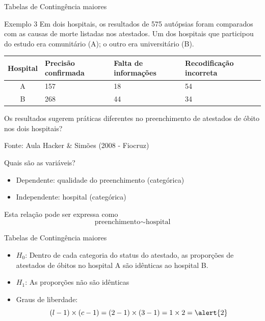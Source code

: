 \documentclass{beamer}
\begin{document}
\begin{frame}{Tabelas de Contingência maiores}
  \begin{exampleblock}{Exemplo 3}
    \footnotesize
    Em dois hospitais, os resultados de 575 autópsias
    foram comparados com as causas de morte listadas nos
    atestados. Um dos hospitais que participou do estudo era
    comunitário (A); o outro era universitário (B).

    \bigskip
    \scriptsize
    \begin{tabular}{c|p{2cm}|p{2cm}|p{2cm}}
      Hospital & Precisão confirmada & Falta de informações &
      Recodificação incorreta \\
      \hline
      A & 157 & 18 & 54 \\
      \hline
      B & 268 & 44 & 34 \\
    \end{tabular}
    \small
    \bigskip
    \bigskip
    Os resultados sugerem práticas diferentes no preenchimento de
    atestados de óbito nos dois hospitais?
  \end{exampleblock}
  \vfill
  {\hfill \footnotesize Fonte: Aula Hacker \& Simões (2008 - Fiocruz)}
\end{frame}

\begin{frame}{Quais são as variáveis?}
  \begin{itemize}
    \small
  \item Dependente: qualidade do preenchimento (categórica)
  \item Independente: hospital (categórica)
  \end{itemize}
  \vfill
  \begin{block}{Esta relação pode ser expressa como}
    \begin{displaymath}
      \text{preenchimento} \sim \text{hospital}
    \end{displaymath}
  \end{block}
\end{frame}

\begin{frame}{Tabelas de Contingência maiores}
  \begin{itemize}
    \small
  \item $H_0$: Dentro de cada categoria do status do atestado, as
    proporções de atestados de óbitos no hospital A são idênticas ao
    hospital B.
  \item $H_1$: As proporções não são idênticas
  \item Graus de liberdade:
    \begin{displaymath}
      (l -1)\times (c-1) = (2-1) \times (3-1)
      = 1 \times 2 = \alert{2}
    \end{displaymath}
  \end{itemize}
\end{frame}
\end{document}
